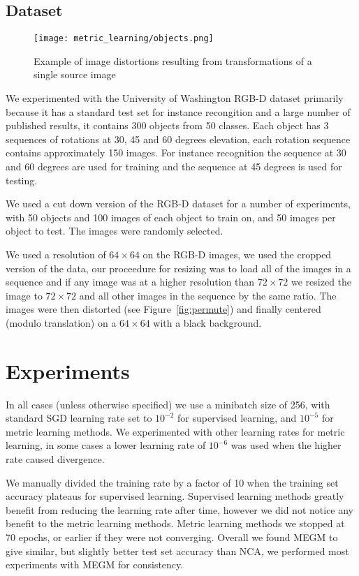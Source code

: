 \subsection {Dataset}

\begin{figure}[h]
\centering
\texttt{[image: metric\_learning/objects.png]}
\caption{Example of image distortions resulting from transformations of a single source image}
\label{fig:dataset}
\end{figure}

We experimented with the University of Washington RGB-D dataset primarily because it has a standard test set for instance recongition and a large number of published results, it contains 300 objects from 50 classes. Each object has 3 sequences of rotations at 30, 45 and 60 degrees elevation, each rotation sequence contains approximately 150 images. For instance recognition the sequence at 30 and 60 degrees are used for training and the sequence at 45 degrees is used for testing. 

We used a cut down version of the RGB-D dataset for a number of experiments, with 50 objects and 100 images of each object to train on, and 50 images per object to test. The images were randomly selected.

We used a resolution of $ 64\times64 $ on the RGB-D images, we used the cropped version of the data, our proceedure for resizing was to load all of the images in a sequence and if any image was at a higher resolution than $ 72\times72 $ we resized the image to $ 72\times72 $ and all other images in the sequence by the same ratio. The images were then distorted (see Figure~\ref{fig:permute}) and finally centered (modulo translation) on a  $ 64\times64 $ with a black background.


\section {Experiments}


In all cases (unless otherwise specified) we use a minibatch size of 256, with standard \gls{SGD} learning rate set to $ 10^{-2} $ for supervised learning, and $ 10^{-5} $ for metric learning methods. We experimented with other learning rates for metric learning, in some cases a lower learning rate of $ 10^{-6} $ was used when the higher rate caused divergence.

We manually divided the training rate by a factor of 10 when the training set accuracy plateaus for supervised learning. Supervised learning methods greatly benefit from reducing the learning rate after time, however we did not notice any benefit to the metric learning methods. Metric learning methods we stopped at 70 epochs, or earlier if they were not converging. Overall we found \gls{MEGM} to give similar, but slightly better test set accuracy than \gls{NCA}, we performed most experiments with \gls{MEGM} for consistency.



